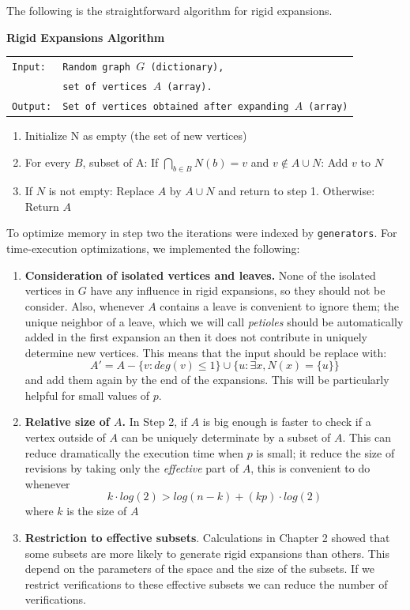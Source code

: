 The following is the straightforward algorithm for rigid expansions.

\begin{cajita}
\textbf{Rigid Expansions Algorithm} \hfill \break

\begin{tabular}{ l l }
\texttt{Input:} &  \texttt{Random graph $G$ (dictionary),} \\
                &  \texttt{set of vertices $A$ (array).}\\
\texttt{Output:} & \texttt{Set of vertices obtained after expanding $A$ (array)} \\
\end{tabular}
\begin{enumerate}
\item Initialize N as empty (the set of new vertices)
\item For every $B$, subset of A:\hfill \break
\hphantom{12} If $\bigcap\limits_{b\in B} N(b) = v$ and $v\not\in A\cup N$: \hfill \break
\hphantom{1234} Add $v$ to $N$
\item If $N$ is not empty: \hfill \break
\hphantom{12} Replace $A$ by $A\cup N$ and return to step 1. \hfill \break
      Otherwise:\hfill \break
\hphantom{12} Return $A$
\end{enumerate}
\end{cajita}

To optimize memory in step two the iterations were indexed by \texttt{generators}. For time-execution optimizations, we implemented the following:

\begin{enumerate}
\item \textbf{Consideration of isolated vertices and leaves.} None of the isolated vertices in $G$ have any influence in rigid expansions, so they should not be consider. Also, whenever $A$ contains a leave is convenient to ignore them; the unique neighbor of a leave, which we will call \textit{petioles} should be automatically added in the first expansion an then it does not contribute in uniquely determine new vertices. This means that the input should be replace with:
$$A' = A - \{v: deg(v)\leq 1 \} \cup \{u: \exists x, N(x)=\{u\}\} $$
and add them again by the end of the expansions. This will be particularly helpful for small values of $p$.
\item \textbf{Relative size of $A$.} In Step 2, if $A$ is big enough is faster to check if a vertex outside of $A$ can be uniquely determinate by a subset of $A$. This can reduce dramatically the execution time when $p$ is small; it reduce the size of revisions by taking only the \textit{effective} part of $A$, this is convenient to do whenever
$$k\cdot log(2) > log(n-k) + (kp)\cdot log(2)$$
where $k$ is the size of $A$

\item \textbf{Restriction to effective subsets}. Calculations in Chapter 2 showed that some subsets are more likely to generate rigid expansions than others. This depend on the parameters of the space and the size of the subsets. If we restrict verifications to these effective subsets we can reduce the number of verifications.
\end{enumerate}

